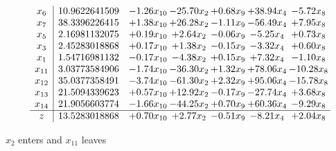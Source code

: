 \documentclass[9pt]{article}
\begin{document}
 \[\begin{array}{c| c c@{\hskip 2pt} c@{\hskip 2pt} c@{\hskip 2pt} c@{\hskip 2pt} c@{\hskip 2pt} }
 x_{6}   &  10.9622641509 & -1.26 x_{10} & -25.70 x_{2} & +  0.68 x_{9} & + 38.94 x_{4} & -5.72 x_{8}\\
 x_{7}   &  38.3396226415 & +  1.38 x_{10} & + 26.28 x_{2} & -1.11 x_{9} & -56.49 x_{4} & +  7.95 x_{8}\\
 x_{5}   &  2.16981132075 & +  0.19 x_{10} & +  2.64 x_{2} & -0.06 x_{9} & -5.25 x_{4} & +  0.73 x_{8}\\
 x_{3}   &  2.45283018868 & +  0.17 x_{10} & +  1.38 x_{2} & -0.15 x_{9} & -3.32 x_{4} & +  0.60 x_{8}\\
 x_{1}   &  1.54716981132 & -0.17 x_{10} & -4.38 x_{2} & +  0.15 x_{9} & +  7.32 x_{4} & -1.10 x_{8}\\
 x_{11}   &  3.03773584906 & -1.74 x_{10} & -36.30 x_{2} & +  1.32 x_{9} & + 78.06 x_{4} & -10.28 x_{8}\\
 x_{12}   &  35.0377358491 & -3.74 x_{10} & -61.30 x_{2} & +  2.32 x_{9} & + 95.06 x_{4} & -15.78 x_{8}\\
 x_{13}   &  21.5094339623 & +  0.57 x_{10} & + 12.92 x_{2} & -0.17 x_{9} & -27.74 x_{4} & +  3.68 x_{8}\\
 x_{14}   &  21.9056603774 & -1.66 x_{10} & -44.25 x_{2} & +  0.70 x_{9} & + 60.36 x_{4} & -9.29 x_{8}\\
\hline
z    &  13.5283018868 & +  0.70 x_{10} & +  2.77 x_{2} & -0.51 x_{9} & -8.21 x_{4} & +  2.04 x_{8}\\
\end{array}\]


 $ x_{2} $ enters and $ x_{11} $ leaves 
\end{document}
